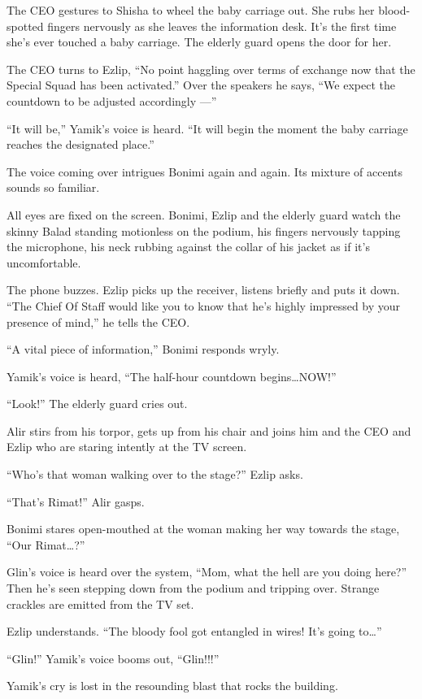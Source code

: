 \documentclass[twoside,11pt,openany]{book}
\begin{document}
The CEO gestures to Shisha to wheel the baby carriage out. She rubs her blood-spotted fingers nervously as she leaves
the information desk. It's the first time she's ever touched a baby carriage. The elderly guard opens the door for her.

The CEO turns to Ezlip, ``No point haggling over terms of exchange now that
the Special Squad has been
activated.'' Over the speakers he says,
``We expect the countdown to be adjusted accordingly ---''

``It will be,'' Yamik's voice is heard. ``It will begin the moment the baby
carriage reaches{ }the designated place.''

The voice coming over intrigues Bonimi again and again. Its mixture of accents sounds so familiar.

All eyes are fixed on the screen.{ }Bonimi, Ezlip and the elderly guard watch
the skinny Balad standing motionless on the podium, his fingers nervously tapping the microphone, his neck rubbing
against the collar of his jacket as if it{'}s uncomfortable.

The phone buzzes. Ezlip picks up the receiver, listens briefly and puts it down. ``The Chief Of Staff would
like you to know that he's highly impressed by your presence of mind,'' he tells the CEO.

``A vital piece of information,'' Bonimi responds wryly.

Yamik's voice is heard, ``The half-hour countdown
begins{\ldots}NOW!''

``Look!'' The elderly guard cries out.

Alir stirs from his torpor, gets up from his chair and joins him and the CEO and Ezlip who are staring intently at the
TV screen.

``Who's that woman walking over to the stage?'' Ezlip asks.

``That's Rimat!'' Alir gasps.

Bonimi stares open-mouthed at the woman making her way towards the stage, ``Our
Rimat{\ldots}?''

Glin's voice is heard over the system, ``Mom, what the hell are you doing here?'' Then
he's seen stepping down from the podium and tripping over. Strange crackles
are emitted from the TV set.

Ezlip understands. ``The bloody fool got entangled in wires! It's going to{\ldots}''

``Glin!'' Yamik's voice booms{ }out,
``Glin!!!''

Yamik's cry is lost in the resounding blast that rocks the building.
\end{document}
